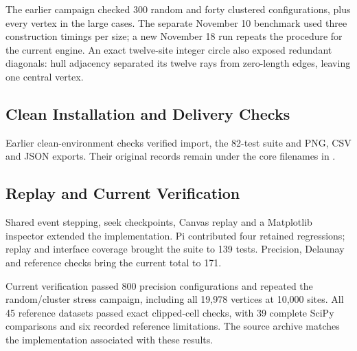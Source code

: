 The earlier campaign checked 300 random and forty clustered configurations, plus every vertex in the large cases. The separate November 10 benchmark used three construction timings per size; a new November 18 run repeats the procedure for the current engine. An exact twelve-site integer circle also exposed redundant diagonals: hull adjacency separated its twelve rays from zero-length edges, leaving one central vertex.

\subsection{Clean Installation and Delivery Checks}

Earlier clean-environment checks verified import, the 82-test suite and PNG, CSV and JSON exports. Their original records remain under the core filenames in .

\subsection{Replay and Current Verification}

Shared event stepping, seek checkpoints, Canvas replay and a Matplotlib inspector extended the implementation. Pi contributed four retained regressions; replay and interface coverage brought the suite to 139 tests. Precision, Delaunay and reference checks bring the current total to 171.

Current verification passed 800 precision configurations and repeated the random/cluster stress campaign, including all 19,978 vertices at 10,000 sites. All 45 reference datasets passed exact clipped-cell checks, with 39 complete SciPy comparisons and six recorded reference limitations. The source archive matches the implementation associated with these results.

